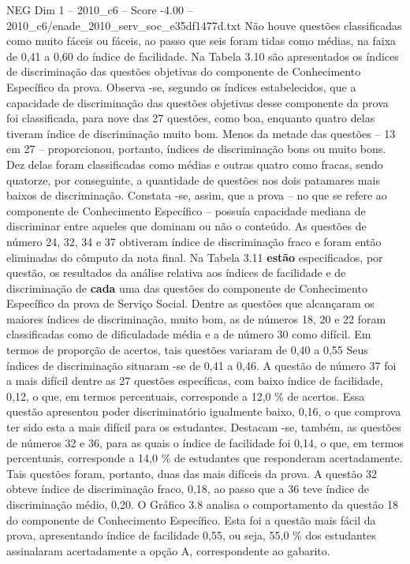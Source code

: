 \begin{textsample}{NEG Dim 1 – 2010\_c6 – Score -4.00 – 2010\_c6/enade\_2010\_serv\_soc\_e35df1477d.txt}
Não houve questões classificadas como muito fáceis ou fáceis, ao passo que seis foram tidas como médias, na faixa de 0,41 a 0,60 do índice de facilidade.
Na Tabela 3.10 são apresentados os índices de discriminação das questões objetivas do componente de Conhecimento Específico da prova.
Observa -se, segundo os índices estabelecidos, que a capacidade de discriminação das questões objetivas desse componente da prova foi classificada, para nove das 27 questões, como boa, enquanto quatro delas tiveram índice de discriminação muito bom.
Menos da metade das questões – 13 em 27 – proporcionou, portanto, índices de discriminação bons ou muito bons.
Dez delas foram classificadas como médias e outras quatro como fracas, sendo quatorze, por conseguinte, a quantidade de questões nos dois patamares mais baixos de discriminação.
Constata -se, assim, que a prova – no que se refere ao componente de Conhecimento Específico – possuía capacidade mediana de discriminar entre aqueles que dominam ou não o conteúdo.
As questões de número 24, 32, 34 e 37 obtiveram índice de discriminação fraco e foram então eliminadas do cômputo da nota final.
Na Tabela 3.11 \textbf{estão} especificados, por questão, os resultados da análise relativa aos índices de facilidade e de discriminação de \textbf{cada} uma das questões do componente de Conhecimento Específico da prova de Serviço Social.
Dentre as questões que alcançaram os maiores índices de discriminação, muito bom, as de números 18, 20 e 22 foram classificadas como de dificuladade média e a de número 30 como difícil.
Em termos de proporção de acertos, tais questões variaram de 0,40 a 0,55 Seus índices de discriminação situaram -se de 0,41 a 0,46.
A questão de número 37 foi a mais difícil dentre as 27 questões específicas, com baixo índice de facilidade, 0,12, o que, em termos percentuais, corresponde a 12,0 \% de acertos.
Essa questão apresentou poder discriminatório igualmente baixo, 0,16, o que comprova ter sido esta a mais difícil para os estudantes.
Destacam -se, também, as questões de números 32 e 36, para as quais o índice de facilidade foi 0,14, o que, em termos percentuais, corresponde a 14,0 \% de estudantes que responderam acertadamente.
Tais questões foram, portanto, duas das mais difíceis da prova.
A questão 32 obteve índice de discriminação fraco, 0,18, ao passo que a 36 teve índice de discriminação médio, 0,20.
O Gráfico 3.8 analisa o comportamento da questão 18 do componente de Conhecimento Específico.
Esta foi a questão mais fácil da prova, apresentando índice de facilidade 0,55, ou seja, 55,0 \% dos estudantes assinalaram acertadamente a opção A, correspondente ao gabarito.

\end{textsample}

